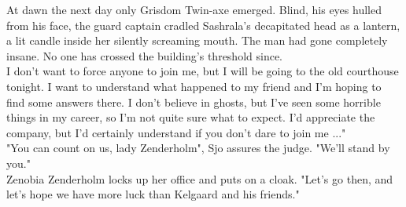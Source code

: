 At dawn the next day only Grisdom Twin-axe emerged. Blind, his eyes hulled from his face, the guard captain cradled Sashrala's decapitated head as a lantern, a lit candle inside her silently screaming mouth. The man had gone completely insane. No one has crossed the building's threshold since.\\

I don't want to force anyone to join me, but I will be going to the old courthouse tonight. I want to understand what happened to my friend and I'm hoping to find some answers there. I don't believe in ghosts, but I've seen some horrible things in my career, so I'm not quite sure what to expect. I'd appreciate the company, but I'd certainly understand if you don't dare to join me ..."\\

"You can count on us, lady Zenderholm", Sjo assures the judge. "We'll stand by you."\\

Zenobia Zenderholm locks up her office and puts on a cloak. "Let's go then, and let's hope we have more luck than Kelgaard and his friends."\\

